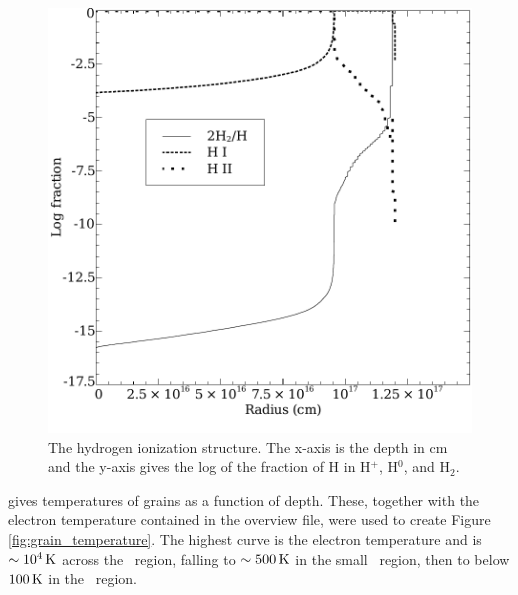 \documentclass[12pt,twoside]{article}
\begin{document}
\begin{figure}
\begin{center}
\includegraphics[clip=on,width=0.8\columnwidth,height=0.8\textheight,keepaspectratio]{hydrogen_structure}
\end{center}
\caption{The hydrogen ionization structure.
The x-axis is the depth in cm and the
y-axis gives the log of the fraction of H in H$^+$, H$^0$, and H$_2$.}
\label{fig:hydrogen_structure}
\end{figure}

  gives
temperatures of grains as a function of
depth.
These, together with the electron temperature contained in the
overview file, were used to create Figure \ref{fig:grain_temperature}.
The highest curve
is the electron temperature and is $\sim 10^4 {\rm\thinspace K}$
across the \hplus\ region, falling
to $\sim 500 {\rm\thinspace K}$ in the small \hO\ region,
then to below $100 {\rm\thinspace K}$ in the \htwo\ region.
\end{document}
